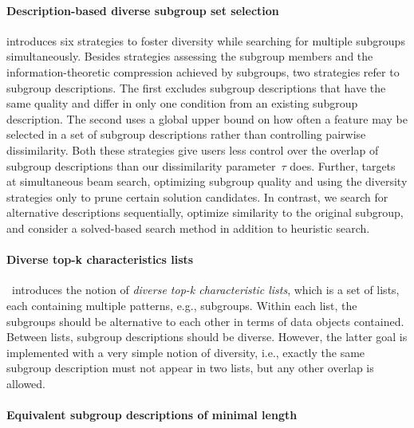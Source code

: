 \documentclass{article}
\theoremstyle{definition}
\begin{document}
\paragraph{Description-based diverse subgroup set selection}

\cite{leeuwen2012diverse} introduces six strategies to foster diversity while searching for multiple subgroups simultaneously.
Besides strategies assessing the subgroup members and the information-theoretic compression achieved by subgroups, two strategies refer to subgroup descriptions.
The first excludes subgroup descriptions that have the same quality and differ in only one condition from an existing subgroup description.
The second uses a global upper bound on how often a feature may be selected in a set of subgroup descriptions rather than controlling pairwise dissimilarity.
Both these strategies give users less control over the overlap of subgroup descriptions than our dissimilarity parameter~$\tau$ does.
Further, \cite{leeuwen2012diverse} targets at simultaneous beam search, optimizing subgroup quality and using the diversity strategies only to prune certain solution candidates.
In contrast, we search for alternative descriptions sequentially, optimize similarity to the original subgroup, and consider a solved-based search method in addition to heuristic search.

\paragraph{Diverse top-k characteristics lists}

\cite{lopez2023discovering}~introduces the notion of \emph{diverse top-k characteristic lists}, which is a set of lists, each containing multiple patterns, e.g., subgroups.
Within each list, the subgroups should be alternative to each other in terms of data objects contained.
Between lists, subgroup descriptions should be diverse.
However, the latter goal is implemented with a very simple notion of diversity, i.e., exactly the same subgroup description must not appear in two lists, but any other overlap is allowed.

\paragraph{Equivalent subgroup descriptions of minimal length}
\end{document}
